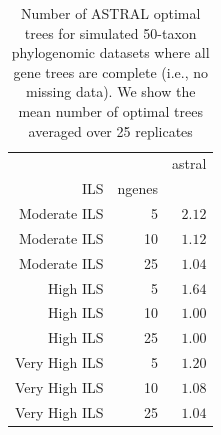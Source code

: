 \begin{table}
\centering
\begin{tabular}{|rr|r|}
 
\hline
 & & astral\\
ILS&ngenes&\\


\hline 
\hline
Moderate ILS&5&	$2.12$\\
Moderate ILS&10	&$1.12$\\
Moderate ILS&25	&$1.04$\\
\hline
High ILS&5&	$1.64$\\
High ILS&10&	$1.00$\\
High ILS&25&	$1.00$\\
\hline
Very High ILS&5	&$1.20$\\
Very High ILS&10	&$1.08$\\
Very High ILS&25	&$1.04$\\
\hline
\end{tabular}

\caption[Number of ASTRAL optimal trees for simulated
  50-taxon phylogenomic datasets where all gene trees are complete (i.e., no missing data)]{Number of ASTRAL optimal trees for simulated
  50-taxon phylogenomic datasets where all gene trees are complete (i.e., no missing data). We show the mean number
  of optimal trees averaged over 25 replicates} \label{astral_counts}
\end{table}




